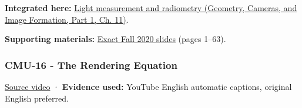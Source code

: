 \textbf{Integrated here:} \href{../03-Geometry-Cameras-and-Image-Formation-P01/main.pdf\#nameddest=03-visual-computing-i-ch004-light-measurement-and-radiometry}{Light measurement and radiometry (Geometry, Cameras, and Image Formation, Part 1, Ch. 11)}.

\textbf{Supporting materials:} \href{https://15462.courses.cs.cmu.edu/fall2020content/lectures/15_radiometry/15_radiometry_slides.pdf}{Exact Fall 2020 slides} (pages 1--63).

\subsubsection{CMU-16 - The Rendering Equation}\label{04-visual-computing-ii-ch036-cmu-16---the-rendering-equation}

\hypertarget{04-visual-computing-ii-ch036-cmu-16---the-rendering-equation}{}

\href{https://www.youtube.com/watch?v=Ttxdbn7TSLI}{Source video} · \textbf{Evidence used:} YouTube English automatic captions, original English preferred.

